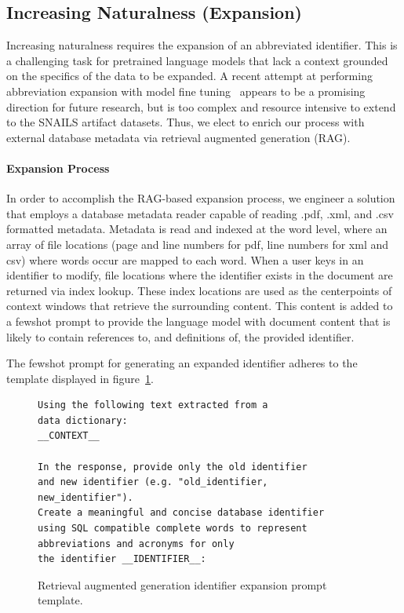 \subsection{Increasing Naturalness (Expansion)}

Increasing naturalness requires the expansion of an abbreviated identifier.
This is a challenging task for pretrained language models that lack a context grounded on the specifics of the data to be expanded.
A recent attempt at performing abbreviation expansion with model fine tuning~\cite{nameguess}  appears to be a promising direction for future research, but is too complex and resource intensive to extend to the SNAILS artifact datasets. Thus, we elect to enrich our process with external database metadata via retrieval augmented generation (RAG).

\paragraph{\textbf{Expansion Process}}
In order to accomplish the RAG-based expansion process, we engineer a solution that employs a database metadata reader capable of reading .pdf, .xml, and .csv formatted metadata.
Metadata is read and indexed at the word level, where an array of file locations (page and line numbers for pdf, line numbers for xml and csv) where words occur are mapped to each word.
When a user keys in an identifier to modify, file locations where the identifier exists in the document are returned via index lookup.
These index locations are used as the centerpoints of context windows that retrieve the surrounding content.
This content is added to a fewshot prompt to provide the language model with document content that is likely to contain references to, and definitions of, the provided identifier.

The fewshot prompt for generating an expanded identifier adheres to the template displayed in figure~\ref{fig:ragtemplate}.

\begin{figure}
\begin{Verbatim}[frame=single,fillcolor=\color{lightgray}]
Using the following text extracted from a 
data dictionary:
__CONTEXT__

In the response, provide only the old identifier 
and new identifier (e.g. "old_identifier, 
new_identifier").
Create a meaningful and concise database identifier 
using SQL compatible complete words to represent 
abbreviations and acronyms for only 
the identifier __IDENTIFIER__:
\end{Verbatim}
\caption{Retrieval augmented generation identifier expansion prompt template.}
\label{fig:ragtemplate}
\end{figure}

